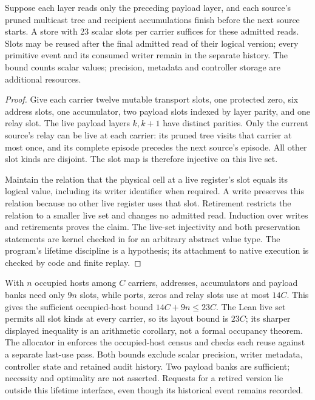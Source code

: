 \begin{proposition}
\label{prop:source-routing-live-storage}
Suppose each layer reads only the preceding payload layer, and each
source's pruned multicast tree and recipient accumulations finish before
the next source starts. A store with 23 scalar slots per carrier suffices
for these admitted reads. Slots may be reused after the final admitted
read of their logical version; every primitive event and its consumed
writer remain in the separate history. The bound counts scalar values;
precision, metadata and controller storage are additional resources.
\end{proposition}
\begin{proof}
Give each carrier twelve mutable transport slots, one protected zero,
six address slots, one accumulator, two payload slots indexed by layer
parity, and one relay slot. The live payload layers $k,k+1$ have distinct
parities. Only the current source's relay can be live at each carrier:
its pruned tree visits that carrier at most once, and its complete episode
precedes the next source's episode. All other slot kinds are disjoint.
The slot map is therefore injective on this live set.

Maintain the relation that the physical cell at a live register's slot
equals its logical value, including its writer identifier when required.
A write preserves this relation because no other live register uses that
slot. Retirement restricts the relation to a smaller live set and changes
no admitted read. Induction over writes and retirements proves the claim.
The live-set injectivity and both preservation statements are kernel
checked in  for an arbitrary
abstract value type. The program's lifetime discipline is a hypothesis;
its attachment to native execution is checked by code and finite replay.
\end{proof}

With $n$ occupied hosts among $C$ carriers, addresses, accumulators and
payload banks need only $9n$ slots, while ports, zeros and relay slots
use at most $14C$. This gives the sufficient occupied-host bound
$14C+9n\leq23C$. The Lean live set permits all slot kinds at every
carrier, so its layout bound is $23C$; its sharper displayed inequality
is an arithmetic corollary, not a formal occupancy theorem. The allocator
in  enforces the occupied-host
census and checks each reuse against a separate last-use pass. Both
bounds exclude scalar precision, writer metadata, controller state and
retained audit history. Two payload banks are sufficient; necessity and
optimality are not asserted. Requests for a retired version lie outside
this lifetime interface, even though its historical event remains recorded.

